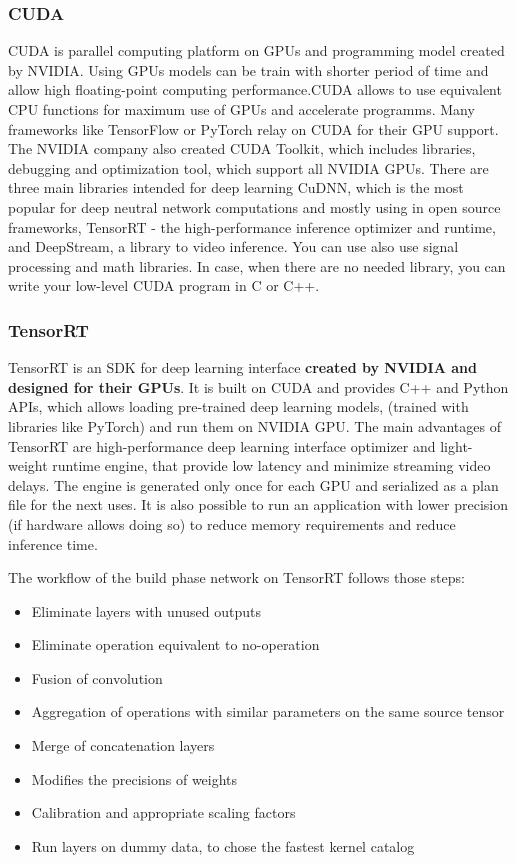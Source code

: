 \documentclass[../Main.tex]{subfiles}
\begin{document}
    \subsubsection{CUDA}
    CUDA is parallel computing platform on GPUs and programming model created by NVIDIA. Using GPUs models can be train with shorter period of time and allow high floating-point computing performance.CUDA allows to use equivalent CPU functions for maximum use of GPUs and accelerate programms. Many frameworks like TensorFlow or PyTorch relay on CUDA for their GPU support. The NVIDIA company also created CUDA Toolkit, which includes libraries, debugging and optimization tool, which support all NVIDIA GPUs. There are three main libraries intended for deep learning CuDNN, which is the most popular for deep neutral network computations and mostly using in open source frameworks, TensorRT - the high-performance inference optimizer and runtime, and DeepStream, a library to video inference. You can use also use signal processing and math libraries. In case, when there are no needed library, you can write your low-level CUDA program in C or C++.  
    
    \subsubsection{TensorRT} \label{trt_chapter}
    TensorRT is an SDK for deep learning interface \textbf{created by NVIDIA and designed for their GPUs}. It is built on CUDA and provides C++ and Python APIs, which allows loading pre-trained deep learning models, (trained with libraries like PyTorch) and run them on NVIDIA GPU. The main advantages of TensorRT are high-performance deep learning interface optimizer and light-weight runtime engine, that provide low latency and minimize streaming video delays. The engine is generated only once for each GPU and serialized as a plan file for the next uses. It is also possible to run an application with lower precision (if hardware allows doing so) to reduce memory requirements and reduce inference time. 
    
    The workflow of the build phase network on TensorRT follows those steps:
    \begin{itemize}
        \item Eliminate layers with unused outputs
        \item Eliminate operation equivalent to no-operation
        \item Fusion of convolution
        \item Aggregation of operations with similar parameters on the same source tensor 
        \item Merge of concatenation layers
        \item Modifies the precisions of weights 
        \item Calibration and appropriate scaling factors
        \item Run layers on dummy data, to chose the fastest kernel catalog
    \end{itemize}
    
\end{document}
